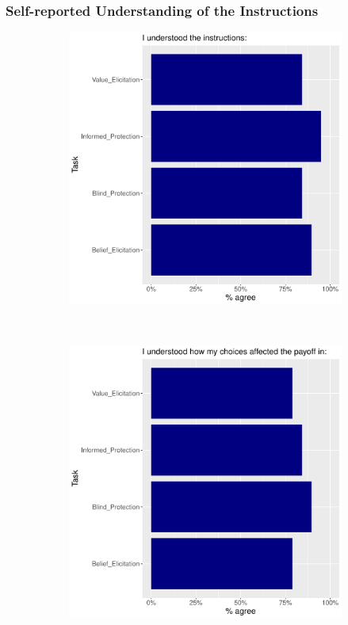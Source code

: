 \documentclass[11pt,hyperref={bookmarks=false}]{beamer}
\begin{document}
\iffalse
\begin{frame}
\frametitle{Self-reported Understanding of the Instructions}
\begin{figure}[h]
\begin{subfigure}{0.45\textwidth}
\includegraphics[width=\textwidth]{Graphs/Uplot1.pdf}
\end{subfigure}
~
\begin{subfigure}{0.45\textwidth}
\includegraphics[width=\textwidth]{Graphs/Uplot2.pdf}
\end{subfigure}
\end{figure}
\end{frame}
\end{document}
